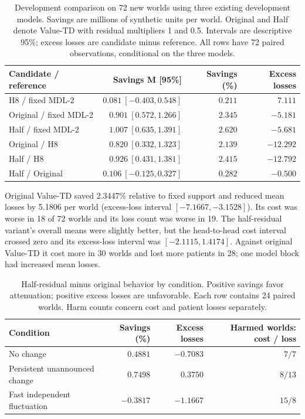 \documentclass[preprint,review,12pt]{elsarticle}
\begin{document}
\begin{table}[tbp]
\centering
\caption{Development comparison on 72 new worlds using three existing
development models. Savings are millions of synthetic units per world.
Original and Half denote Value-TD with residual multipliers 1 and 0.5.
Intervals are descriptive 95\%; excess losses are candidate minus reference.
All rows have 72 paired observations, conditional on the three models.}
\label{tab:attenuation-pairs}
\small
\setlength{\tabcolsep}{3pt}
\begin{tabularx}{\textwidth}{Xrrr}
\toprule
Candidate / reference & Savings M [95\%] & Savings (\%) & Excess losses \\
\midrule
H8 / fixed MDL-2 & $0.081\ [-0.403,0.548]$ & $0.211$ & $7.111$ \\
Original / fixed MDL-2 & $0.901\ [0.572,1.266]$ & $2.345$ & $-5.181$ \\
Half / fixed MDL-2 & $1.007\ [0.635,1.391]$ & $2.620$ & $-5.681$ \\
Original / H8 & $0.820\ [0.332,1.323]$ & $2.139$ & $-12.292$ \\
Half / H8 & $0.926\ [0.431,1.381]$ & $2.415$ & $-12.792$ \\
Half / Original & $0.106\ [-0.125,0.327]$ & $0.282$ & $-0.500$ \\
\bottomrule
\end{tabularx}
\end{table}

Original Value-TD saved 2.3447\% relative to fixed support and reduced mean
losses by 5.1806 per world (excess-loss interval $[-7.1667,-3.1528]$).
Its cost was worse in 18 of 72 worlds and its loss count was worse in 19.
The half-residual variant's overall means were slightly better, but the
head-to-head cost interval crossed zero and its excess-loss interval was
$[-2.1115,1.4174]$. Against original Value-TD it cost more in 30 worlds
and lost more patients in 28; one model block had increased mean losses.

\begin{table}[tbp]
\centering
\caption{Half-residual minus original behavior by condition. Positive savings
favor attenuation; positive excess losses are unfavorable. Each row contains
24 paired worlds. Harm counts concern cost and patient losses separately.}
\label{tab:attenuation-conditions}
\small
\begin{tabularx}{\textwidth}{Xrrr}
\toprule
Condition & Savings (\%) & Excess losses & Harmed worlds: cost / loss \\
\midrule
No change & $0.4881$ & $-0.7083$ & $7/7$ \\
Persistent unannounced change & $0.7498$ & $0.3750$ & $8/13$ \\
Fast independent fluctuation & $-0.3817$ & $-1.1667$ & $15/8$ \\
\bottomrule
\end{tabularx}
\end{table}
\end{document}
